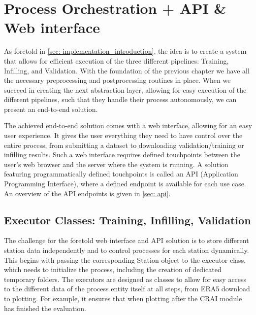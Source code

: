 \section{Process Orchestration + API \& Web interface}
\label{sec: process_orchestration}

As foretold in \autoref{sec: implementation_introduction}, the idea is to create a system that allows for efficient execution of the three different pipelines: Training, Infilling, and Validation.
With the foundation of the previous chapter we have all the necessary preprocessing and postprocessing routines in place.
When we succeed in creating the next abstraction layer, allowing for easy execution of the different pipelines, such that they handle their process autonomously, we can present an end-to-end solution.

The achieved end-to-end solution comes with a web interface, allowing for an easy user experience.
It gives the user everything they need to have control over the entire process, from submitting a dataset to downloading validation/training or infilling results.
Such a web interface requires defined touchpoints between the user's web browser and the server where the system is running.
A solution featuring programmatically defined touchpoints is called an API (Application Programming Interface), where a defined endpoint is available for each use case.
An overview of the API endpoints is given in \autoref{sec: api}. 

\subsection{Executor Classes: Training, Infilling, Validation}

The challenge for the foretold web interface and API solution is to store different station data independently and to control processes for each station dynamically.
This begins with passing the corresponding Station object to the executor class, which needs to initialize the process, including the creation of dedicated temporary folders.
The executors are designed as classes to allow for easy access to the different data of the process entity itself at all steps, from ERA5 download to plotting. For example, it ensures that when plotting after the CRAI module has finished the evaluation.

